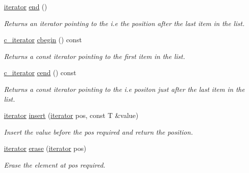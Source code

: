 \begin{DoxyCompactItemize}
\hyperlink{classsc_1_1vector_1_1iterator}{iterator} \hyperlink{classsc_1_1vector_a92378196850ffdcc094f266d40cc2cc5}{end} ()
\begin{DoxyCompactList}\small\item\em Returns an iterator pointing to the i.\+e the position after the last item in the list. \end{DoxyCompactList}\item 
\hyperlink{classsc_1_1vector_1_1c__iterator}{c\+\_\+iterator} \hyperlink{classsc_1_1vector_aa9ef5584dc8f0d021f3689b1b617607d}{cbegin} () const
\begin{DoxyCompactList}\small\item\em Returns a const iterator pointing to the first item in the list. \end{DoxyCompactList}\item 
\hyperlink{classsc_1_1vector_1_1c__iterator}{c\+\_\+iterator} \hyperlink{classsc_1_1vector_a1ab4f567a393988471cc01a206524dee}{cend} () const
\begin{DoxyCompactList}\small\item\em Returns a const iterator pointing to the i.\+e positon just after the last item in the list. \end{DoxyCompactList}\item 
\hyperlink{classsc_1_1vector_1_1iterator}{iterator} \hyperlink{classsc_1_1vector_ac55608c5cee9a8311cbe7c4fde998a9f}{insert} (\hyperlink{classsc_1_1vector_1_1iterator}{iterator} pos, const T \&value)
\begin{DoxyCompactList}\small\item\em Insert the value before the pos required and return the position. \end{DoxyCompactList}\item 
\hyperlink{classsc_1_1vector_1_1iterator}{iterator} \hyperlink{classsc_1_1vector_a9dcc8ea80726caae68ac935ca677abfe}{erase} (\hyperlink{classsc_1_1vector_1_1iterator}{iterator} pos)
\begin{DoxyCompactList}\small\item\em Erase the element at pos required. \end{DoxyCompactList}\end{DoxyCompactItemize}
